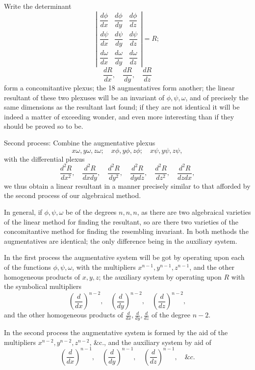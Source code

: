 \documentclass[11pt]{article}
\newcommand{\sourcepage}[1]{\marginpar{\scriptsize p.~#1}}
\begin{document}
{{\sourcepage{300}
Write the determinant
\[
\left|\begin{array}{ccc}
\dfrac{d\phi}{dx}&\dfrac{d\phi}{dy}&\dfrac{d\phi}{dz}\\
\dfrac{d\psi}{dx}&\dfrac{d\psi}{dy}&\dfrac{d\psi}{dz}\\
\dfrac{d\omega}{dx}&\dfrac{d\omega}{dy}&\dfrac{d\omega}{dz}
\end{array}\right|=R;
\]
\[
\frac{dR}{dx},\quad \frac{dR}{dy},\quad \frac{dR}{dz}
\]
form a concomitantive plexus; the 18 augmentatives form another; the linear resultant of these two plexuses will be an invariant of $\phi,\psi,\omega$, and of precisely the same dimensions as the resultant last found; if they are not identical it will be indeed a matter of exceeding wonder, and even more interesting than if they should be proved so to be.

Second process: Combine the augmentative plexus
\[
x\omega,	y\omega,	z\omega;\quad x\phi,	y\phi,	z\phi;\quad x\psi,	y\psi,	z\psi,
\]
with the differential plexus
\[
\frac{d^2R}{dx^2},\quad \frac{d^2R}{dxdy},\quad \frac{d^2R}{dy^2},\quad
\frac{d^2R}{dydz},\quad \frac{d^2R}{dz^2},\quad \frac{d^2R}{dzdx},
\]
we thus obtain a linear resultant in a manner precisely similar to that afforded by the second process of our algebraical method.

In general, if $\phi,\psi,\omega$ be of the degrees $n,n,n$, as there are two algebraical varieties of the linear method for finding the resultant, so are there two varieties of the concomitantive method for finding the resembling invariant. In both methods the augmentatives are identical; the only difference being in the auxiliary system.

In the first process the augmentative system will be got by operating upon each of the functions $\phi,\psi,\omega$, with the multipliers $x^{n-1},y^{n-1},z^{n-1}$, and the other homogeneous products of $x,y,z$; the auxiliary system by operating upon $R$ with the symbolical multipliers
\[
\left(\frac{d}{dx}\right)^{n-2},\quad
\left(\frac{d}{dy}\right)^{n-2},\quad
\left(\frac{d}{dz}\right)^{n-2},
\]
and the other homogeneous products of $\frac{d}{dx},\frac{d}{dy},\frac{d}{dz}$ of the degree $n-2$.

In the second process the augmentative system is formed by the aid of the multipliers $x^{n-2},y^{n-2},z^{n-2}$, \&c., and the auxiliary system by aid of
\[
\left(\frac{d}{dx}\right)^{n-1},\quad
\left(\frac{d}{dy}\right)^{n-1},\quad
\left(\frac{d}{dz}\right)^{n-1},\quad \&c.
\]

}}
\end{document}
